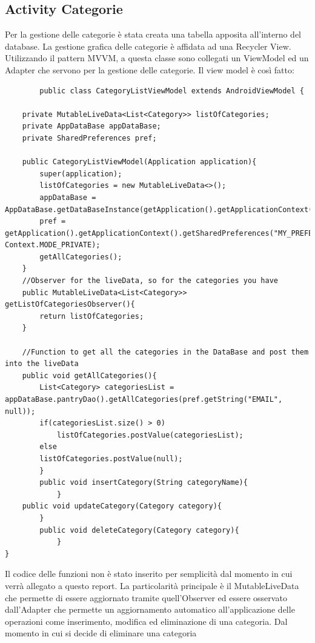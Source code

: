 \documentclass[12pt]{article}
\begin{document}
    \subsection{Activity Categorie}
    Per la gestione delle categorie è stata creata una tabella apposita all'interno del database. La gestione grafica delle 
    categorie è affidata ad una Recycler View. Utilizzando il pattern MVVM, a questa classe sono collegati un ViewModel ed un 
    Adapter che servono per la gestione delle categorie.
    Il view model è così fatto:
    \begin{lstlisting}
        public class CategoryListViewModel extends AndroidViewModel {

    private MutableLiveData<List<Category>> listOfCategories;
    private AppDataBase appDataBase;
    private SharedPreferences pref;

    public CategoryListViewModel(Application application){
        super(application);
        listOfCategories = new MutableLiveData<>();
        appDataBase = AppDataBase.getDataBaseInstance(getApplication().getApplicationContext());
        pref = getApplication().getApplicationContext().getSharedPreferences("MY_PREFERENCES", Context.MODE_PRIVATE);
        getAllCategories();
    }
    //Observer for the liveData, so for the categories you have
    public MutableLiveData<List<Category>> getListOfCategoriesObserver(){
        return listOfCategories;
    }

    //Function to get all the categories in the DataBase and post them into the liveData
    public void getAllCategories(){
        List<Category> categoriesList = appDataBase.pantryDao().getAllCategories(pref.getString("EMAIL", null));
        if(categoriesList.size() > 0)
            listOfCategories.postValue(categoriesList);
        else
        listOfCategories.postValue(null);
        }
        public void insertCategory(String categoryName){    
            }
    public void updateCategory(Category category){    
        }
        public void deleteCategory(Category category){  
            }
}
\end{lstlisting}
Il codice delle funzioni non è stato inserito per semplicità dal momento in cui verrà allegato a questo report.
La particolarità principale è il MutableLiveData che permette di essere aggiornato tramite quell'Observer
ed essere osservato dall'Adapter che permette un aggiornamento automatico all'applicazione delle operazioni
come inserimento, modifica ed eliminazione di una categoria. Dal momento in cui si decide di eliminare una categoria
\end{document}

